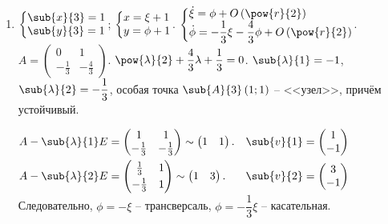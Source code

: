 \documentclass[a5paper,10pt]{article}
\begin{document}
\begin{enumerate}
    \item $\tsys{\sub{x}{3} = 1 \\ \sub{y}{3} = 1}$;
    $\tsys{x = \xi + 1 \\ y = \phi + 1}$.
    $\tsys{
        \dot{\xi} = \phi + O\br{\pow{r}{2}} 
        \\ \dot{\phi} = -\dfrac {1} {3} \xi - \dfrac {4} {3} \phi + O\br{\pow{r}{2}}
    }$. \\
    $A = \begin{pmatrix} 0 &  1 \\ -\frac {1} {3} & -\frac {4} {3} \end{pmatrix}$.
    $\pow{\lambda}{2} + \dfrac {4} {3} \lambda + \dfrac {1} {3} = 0$.
    $\sub{\lambda}{1} = -1$, $\sub{\lambda}{2} = -\dfrac {1} {3}$,
    особая точка $\sub{A}{3}\br{1; 1}$ -- <<узел>>, причём устойчивый.
    
    $\begin{aligned}
        & A - \sub{\lambda}{1} E
        = \begin{pmatrix} 1 & 1 \\ -\frac {1} {3} & -\frac {1} {3} \end{pmatrix}
        \sim \begin{pmatrix} 1 & 1 \end{pmatrix}.
        & \sub{v}{1} = \begin{pmatrix} 1 \\ -1 \end{pmatrix} \\        
        & A - \sub{\lambda}{2} E
        = \begin{pmatrix} \frac {1} {3} \vspace{1mm} & 1 \\ -\frac {1} {3} & 1 \end{pmatrix}
        \sim \begin{pmatrix} 1 & 3 \end{pmatrix}.
        & \sub{v}{2} = \begin{pmatrix} 3 \\ -1 \end{pmatrix}
    \end{aligned}$\\
    Следовательно, $\phi = -\xi$ -- трансверсаль,
    $\phi = -\dfrac {1} {3} \xi$ -- касательная.
    \pagebreak
    

\end{enumerate}
\end{document}
